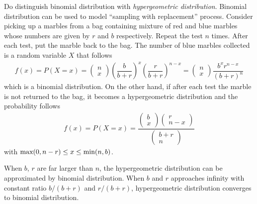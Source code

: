 Do distinguish binomial distribution with \textit{hypergeometric distribution}. Binomial distribution can be used to model ``sampling with replacement'' process. Consider picking up a marbles from a bag containing mixture of red and blue marbles whose numbers are given by $r$ and $b$ respectively. Repeat the test $n$ times. After each test, put the marble back to the bag. The number of blue marbles collected is a random variable $X$ that follows
\begin{eqnarray}
f(x) = P(X=x) = \left(\begin{array}{c}
                        n \\
                        x
                      \end{array}\right)\left(\dfrac{b}{b+r}\right)^x\left(\dfrac{r}{b+r}\right)^{n-x} = \left(\begin{array}{c}
                        n \\
                        x
                      \end{array}\right) \dfrac{b^xr^{n-x}}{(b+r)^n} \nonumber
\end{eqnarray}
which is a binomial distribution. On the other hand, if after each test the marble is not returned to the bag, it becomes a hypergeometric distribution and the probability follows
\begin{eqnarray}
f(x) = P(X=x) = \dfrac{\left(\begin{array}{c}
                               b \\
                               x
                             \end{array}\right)\left(\begin{array}{c}
                                                       r \\
                                                       n-x
                                                     \end{array}\right)}{\left(\begin{array}{c}
                                                                                 b+r \\
                                                                                 n
                                                                               \end{array}\right)} \nonumber
\end{eqnarray}
with $\textup{max}(0, n-r) \leq x \leq \textup{min}(n, b)$.

When $b$, $r$ are far larger than $n$, the hypergeometric distribution can be approximated by binomial distribution. When $b$ and $r$ approaches infinity with constant ratio $b/(b+r)$ and $r/(b+r)$, hypergeometric distribution converges to binomial distribution.

